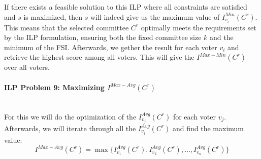 \documentclass{article}
\begin{document}
\begin{itemize}
If there exists a feasible solution to this ILP where all constraints are satisfied and \(s\) is maximized, then \(s\) will indeed give us the maximum value of  \(I_{v_i}^{Min}(C^{r})\). This means that the selected committee \(C^r\) optimally meets the requirements set by the ILP formulation, ensuring both the fixed committee size \(k\) and the minimum of the FSI. Afterwards, we gether the result for each voter $v_i$ and retrieve the highest score among all voters. This will give the $I^{Max-Min}(C^{r})$ over all voters.
\end{itemize}

\paragraph*{ILP Problem 9: Maximizing  $I^{Max-Avg}(C^{r})$}\mbox{} \\
For this we will do the optimization of the $I_{v_j}^{Avg}(C^{r})$ for each voter $v_j$. Afterwards, we will iterate through all the $I_{v_j}^{Avg}(C^{r})$ and find the maximum value:
  \[I^{Max-Avg}(C^{r}) = \max\{ I_{v_1}^{Avg}(C^{r}), I_{v_2}^{Avg}(C^{r}), \ldots, I_{v_n}^{Avg}(C^{r}) \}\]
\end{document}
